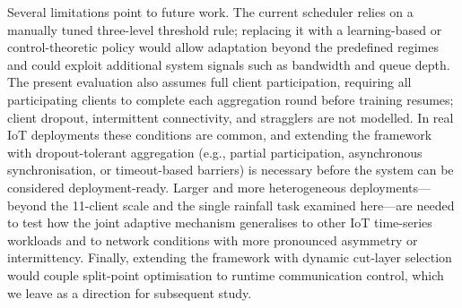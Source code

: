 \documentclass[conference]{IEEEtran}
\begin{document}
Several limitations point to future work. The current scheduler relies on a manually tuned three-level threshold rule; replacing it with a learning-based or control-theoretic policy would allow adaptation beyond the predefined regimes and could exploit additional system signals such as bandwidth and queue depth. The present evaluation also assumes full client participation, requiring all participating clients to complete each aggregation round before training resumes; client dropout, intermittent connectivity, and stragglers are not modelled. In real IoT deployments these conditions are common, and extending the framework with dropout-tolerant aggregation (e.g., partial participation, asynchronous synchronisation, or timeout-based barriers) is necessary before the system can be considered deployment-ready. Larger and more heterogeneous deployments---beyond the 11-client scale and the single rainfall task examined here---are needed to test how the joint adaptive mechanism generalises to other IoT time-series workloads and to network conditions with more pronounced asymmetry or intermittency. Finally, extending the framework with dynamic cut-layer selection would couple split-point optimisation to runtime communication control, which we leave as a direction for subsequent study.





\end{document}
